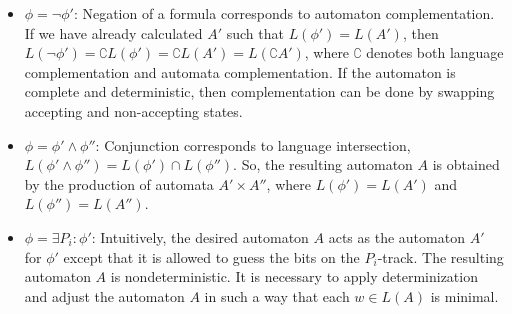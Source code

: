 \documentclass[pdflatex,sn-mathphys-num]{sn-jnl}%
\theoremstyle{thmstyleone}%
\theoremstyle{thmstyletwo}%
\theoremstyle{thmstylethree}%
\begin{document}
\begin{itemize}
\begin{figure}[h]
                    \end{figure}
                \item $\phi = \neg \phi'$: Negation of a formula corresponds to automaton complementation. If we have already calculated $A'$ such that $L(\phi') = L(A')$, then $L(\neg \phi') = \complement L(\phi') = \complement L(A') = L(\complement A')$, where $\complement$ denotes both language complementation and automata complementation. If the automaton is complete and deterministic, then complementation can be done by swapping accepting and non-accepting states.
                \vspace*{0.5em}
                \item $\phi = \phi' \land \phi''$: Conjunction corresponds to language intersection, $L(\phi' \land \phi'') = L(\phi') \cap L(\phi'')$. So, the resulting automaton $A$ is obtained by the production of automata $A' \times A''$, where $L(\phi') = L(A')$ and $L(\phi'') = L(A'')$.
                \vspace*{0.5em}
                \item $\phi = \exists P_i : \phi'$:  Intuitively, the desired automaton $A$ acts as the automaton $A'$ for $\phi'$ except that it is allowed to guess the bits on the $P_i$-track. The resulting automaton $A$ is nondeterministic. It is necessary to apply determinization and adjust the automaton $A$ in such a way that each $w \in L(A)$ is minimal.
            \end{itemize}
\end{document}
